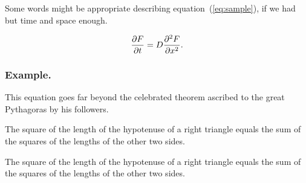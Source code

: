 \documentclass{ifacconf}
\begin{document}
Some words might be appropriate describing equation~(\ref{eq:sample}), if 
we had but time and space enough. 

\begin{equation} \label{eq:sample}
{{\partial F}\over {\partial t}} = D{{\partial^2 F}\over {\partial x^2}}.
\end{equation}

\subsubsection{Example.} This equation goes far beyond the
celebrated theorem ascribed to the great Pythagoras by his followers.

\begin{thm}   %
The square of the length of the hypotenuse of a right triangle equals
the sum of the squares of the lengths of the other two sides.
\end{thm}

\begin{pf}    %
The square of the length of the hypotenuse of a right triangle equals the sum of the squares 
of the lengths of the other two sides.
\end{pf}

\end{document}
